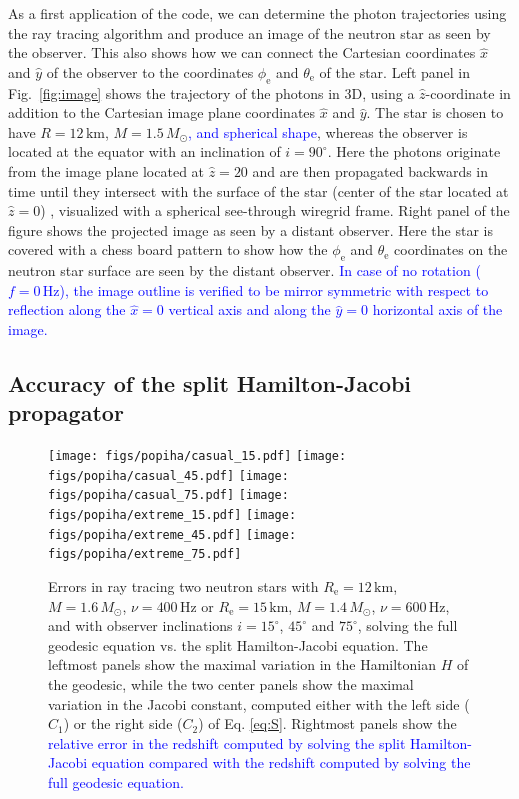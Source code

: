\documentclass{aa}
\newcommand{\refe}[1]{\textcolor{blue}{{#1}}}
\newcommand{\Msun}{\ensuremath{M_{\odot}}}
\begin{document}
As a first application of the code, we can determine the photon trajectories using the ray tracing algorithm and produce an image of the neutron star as seen by the observer.
This also shows how we can connect the Cartesian coordinates $\hat{x}$ and $\hat{y}$ of the observer to the coordinates $\phi_{\mathrm{e}}$ and $\theta_{\mathrm{e}}$ of the star.
Left panel in Fig.~\ref{fig:image} shows the trajectory of the photons in 3D, using a $\hat{z}$-coordinate in addition to the Cartesian image plane coordinates $\hat{x}$ and $\hat{y}$.
The star is chosen to have $R=12\,\mathrm{km}$, $M=1.5\,\Msun$\refe{, and spherical shape}, whereas the observer is located at the equator with an inclination of $i = 90^{\circ}$.
Here the photons originate from the image plane located at $\hat{z} = 20$ and are then propagated backwards in time until they intersect with the surface of the star (center of the star located at $\hat{z} = 0$) , visualized with a spherical see-through wiregrid frame.
Right panel of the figure shows the projected image as seen by a distant observer.
Here the star is covered with a chess board pattern to show how the $\phi_{\mathrm{e}}$ and $\theta_{\mathrm{e}}$ coordinates on the neutron star surface are seen by the distant observer.
\refe{In case of no rotation ($f = 0\,\mathrm{Hz}$), the image outline is verified to be mirror symmetric with respect to reflection along the $\hat{x} = 0$ vertical axis and along the $\hat{y} = 0$ horizontal axis of the image.}


\subsection{Accuracy of the split Hamilton-Jacobi propagator}

\begin{figure}[htbp!]
\centering
\texttt{[image: figs/popiha/casual\_15.pdf]}
\texttt{[image: figs/popiha/casual\_45.pdf]}
\texttt{[image: figs/popiha/casual\_75.pdf]}
\texttt{[image: figs/popiha/extreme\_15.pdf]}
\texttt{[image: figs/popiha/extreme\_45.pdf]}
\texttt{[image: figs/popiha/extreme\_75.pdf]}
\caption{\label{fig:H_C1_C2}
    Errors in ray tracing two neutron stars with $R_{\mathrm{e}}=12\,\mathrm{km}$, $M=1.6\,\Msun$, $\nu=400\,\mathrm{Hz}$ or $R_{\mathrm{e}}=15\,\mathrm{km}$, $M=1.4\,\Msun$, $\nu=600\,\mathrm{Hz}$, and with observer inclinations $i=15^\circ$, $45^\circ$ and $75^\circ$, solving the full geodesic equation vs. the split Hamilton-Jacobi equation.
    The leftmost panels show the maximal variation in the Hamiltonian $H$ of the geodesic, while the two center panels show the maximal variation in the Jacobi constant, computed either with the left side ($C_1$) or the right side ($C_2$) of Eq. \eqref{eq:S}.
    Rightmost panels show the \refe{relative error in the redshift computed by solving the split Hamilton-Jacobi equation compared with the redshift computed by solving the full geodesic equation.}
}
\end{figure}
\end{document}
